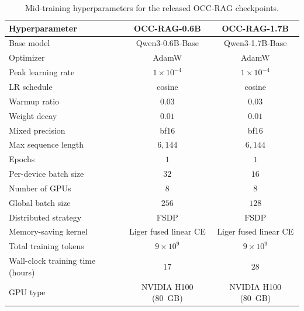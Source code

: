 \begin{table}[H]
\centering
\small
\begin{tabular}{lcc}
\toprule
\textbf{Hyperparameter} & \textbf{OCC-RAG-0.6B} & \textbf{OCC-RAG-1.7B} \\
\midrule
Base model              & Qwen3-0.6B-Base   & Qwen3-1.7B-Base   \\
Optimizer               & AdamW             & AdamW             \\
Peak learning rate      & $1\times10^{-4}$  & $1\times10^{-4}$  \\
LR schedule             & cosine            & cosine            \\
Warmup ratio            & $0.03$            & $0.03$            \\
Weight decay            & $0.01$            & $0.01$            \\
Mixed precision         & bf16              & bf16              \\
Max sequence length     & $6{,}144$         & $6{,}144$         \\
Epochs                  & $1$               & $1$               \\
Per-device batch size   & $32$              & $16$              \\
Number of GPUs          & $8$               & $8$               \\
Global batch size       & $256$             & $128$             \\
Distributed strategy    & FSDP              & FSDP              \\
Memory-saving kernel    & Liger fused linear CE & Liger fused linear CE \\
Total training tokens   & $9\times10^9$     & $9\times10^9$               \\
Wall-clock training time (hours) & $17$              & $28$               \\
GPU type                & NVIDIA H100 (80~GB) & NVIDIA H100 (80~GB)               \\
\bottomrule
\end{tabular}
\caption{Mid-training hyperparameters for the released OCC-RAG checkpoints.}
\label{tab:training-hyperparameters}
\end{table}
